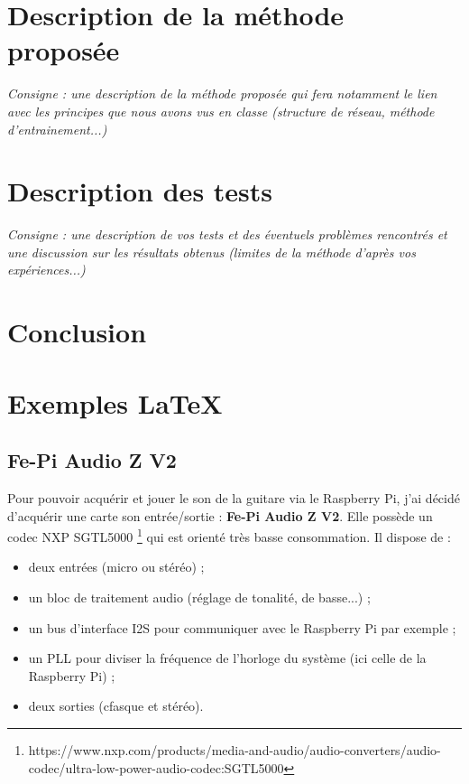 \documentclass[11pt,a4paper]{article}
\begin{document}
    \section{Description de la 	méthode proposée}
    \emph{Consigne : une description de la méthode proposée qui fera notamment le lien avec les principes que nous avons vus en classe (structure de réseau, méthode d'entrainement...)}

    \section{Description des tests}
    \emph{Consigne : une description de vos tests et des éventuels problèmes rencontrés et une discussion sur les résultats obtenus (limites de la méthode d'après vos expériences...)}

    \section{Conclusion}


    \section{Exemples \LaTeX}

        \subsection{Fe-Pi Audio Z V2}
            Pour pouvoir acquérir et jouer le son de la guitare via le Raspberry Pi, j'ai décidé d'acquérir une carte son entrée/sortie : \textbf{Fe-Pi Audio Z V2}. Elle possède un codec NXP SGTL5000 \footnote{https://www.nxp.com/products/media-and-audio/audio-converters/audio-codec/ultra-low-power-audio-codec:SGTL5000} qui est orienté très basse consommation. Il dispose de : 
            \begin{itemize}[noitemsep]
                \item deux entrées (micro ou stéréo) ;
                \item un bloc de traitement audio (réglage de tonalité, de basse...) ;
                \item un bus d'interface I2S pour communiquer avec le Raspberry Pi par exemple ;
                \item un PLL pour diviser la fréquence de l'horloge du système (ici celle de la Raspberry Pi) ;
                \item deux sorties (cfasque et stéréo).
            \end{itemize}
\end{document}
